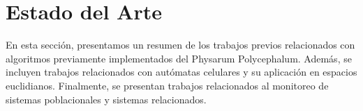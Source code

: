 \section{Estado del Arte}
\label{section:estadoarte}
    En esta secci\'on, presentamos un resumen de los trabajos previos relacionados con algoritmos previamente 
        implementados del Physarum Polycephalum. Adem\'as, se incluyen trabajos relacionados con aut\'omatas celulares
        y su aplicaci\'on en espacios euclidianos. Finalmente, se presentan trabajos relacionados al monitoreo de 
        sistemas poblacionales y sistemas relacionados.
    \vskip 0.5cm
    
    